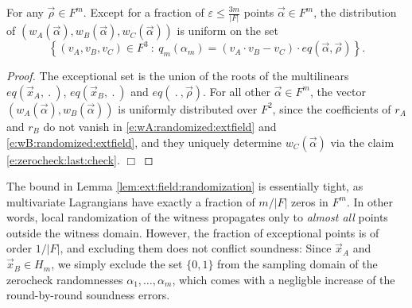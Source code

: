 
\begin{lem}
\label{lem:ext:field:randomization}
For any $\vec\rho\in F^m$.
Except for a fraction of $\varepsilon \leq \frac{3 m}{|F|}$ points $\vec\alpha\in F^m$, 
the distribution of $(w_A(\vec\alpha), w_B(\vec\alpha), w_C(\vec\alpha))$ is uniform on the set
\[
\left\{
(v_A, v_B, v_C) \in F^3 
\::\:
q_m(\alpha_m) = (v_A\cdot v_B - v_C)\cdot eq(\vec\alpha,\vec\rho)
\right\}.
\]
\end{lem}
\begin{proof}
The exceptional set is the union of the roots of the multilinears $eq(\vec x_A, \:.\:)$, $eq(\vec x_B, \:.\:)$  and $eq(\:.\:,\vec\rho)$.
For all other $\vec\alpha\in F^m$, the vector $(w_A(\vec\alpha), w_B(\vec\alpha))$ is uniformly distributed over $F^2$, since the coefficients of $r_A$ and $r_B$ do not vanish in \eqref{e:wA:randomized:extfield} and \eqref{e:wB:randomized:extfield}, and they uniquely determine $w_C(\vec\alpha)$ via the claim \eqref{e:zerocheck:last:check}.
$\Box$
\end{proof}


The bound in Lemma \ref{lem:ext:field:randomization} is essentially tight, as multivariate Lagrangians have exactly a fraction of $m/|F|$ zeros in $F^m$.
In other words, local randomization of the witness propagates only to \textit{almost all} points outside the witness domain.\footnotemark
{}
% 
However, the fraction of exceptional points is of order $1/|F|$, and excluding them does not conflict soundness: 
Since $\vec x_A$ and $\vec x_B \in H_m$, we simply exclude the set $\{0,1\}$ from the sampling domain of the zerocheck randomnesses $\alpha_1,\ldots,\alpha_m$, which comes with a negligble increase of the round-by-round soundness errors.

